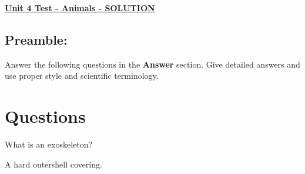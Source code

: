 \documentclass[12pt]{article} %
\begin{document}
	\renewcommand*{\coursecode}{MATH 235} %
	\renewcommand*{\assgnnumber}{Assignment 1} %
	\renewcommand*{\submdate}{September 14, 2021} %
	\renewcommand*{\studentfname}{Abdullah} %
	\renewcommand*{\studentlname}{Zubair} %
    \renewcommand*{\proofname}{Proof:}

	\renewcommand\qedsymbol{$\blacksquare$}
	\setfigpath
	\fancyhfoffset[L,O]{0pt} %




\begin{center}
	\textbf{\underline{\Huge{Unit 4 Test - Animals - SOLUTION}}}
\end{center}

\subsection*{Preamble:}
Answer the following questions in the \textbf{Answer} section. Give detailed answers and use proper style and scientific terminology.
\section*{Questions}
  \begin{qstn}
    What is an exoskeleton?
  \end{qstn}
  \begin{soln}
    A hard outershell covering.
  \end{soln}
\end{document}
